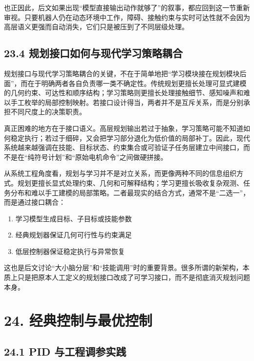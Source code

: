也正因此，后文如果出现“模型直接输出动作就够了”的叙事，都应回到这一节重新审视。只要机器人仍在动态环境中工作，障碍、接触约束与实时可达性就不会因为高层语义更强而自动消失，它们只是被压到了不同层级处理。

\subsection*{23.4 规划接口如何与现代学习策略耦合}


规划接口与现代学习策略耦合的关键，不在于简单地把“学习模块接在规划模块后面”，而在于明确两者各自负责哪一类不确定性。传统规划更擅长处理可显式建模的几何约束、可达性和顺序结构；学习策略则更擅长处理接触细节、感知噪声和难以手工枚举的局部控制映射。若接口设计得当，两者并不是互斥关系，而是分别承担不同尺度上的决策职责。

真正困难的地方在于接口语义。高层规划输出若过于抽象，学习策略可能不知道如何稳定执行；若过于细碎，又会把学习部分退化为低价值的局部补丁。因此，现代系统越来越强调在技能、目标状态、约束集合或可验证子任务层建立中间接口，而不是在“纯符号计划”和“原始电机命令”之间做硬拼接。

从系统工程角度看，规划与学习并不是对立关系，而更像两种不同的信息组织方式。规划更擅长显式处理约束、几何和可解释结构；学习更擅长吸收复杂观测、任务分布和难以手工建模的局部策略。二者最现实的结合方式，通常不是“二选一”，而是通过接口耦合：

\begin{enumerate}
\item 学习模型生成目标、子目标或技能参数
\item 经典规划器保证几何可行性与约束满足
\item 低层控制器保证稳定执行与异常恢复
\end{enumerate}

这也是后文讨论“大小脑分层”和“技能调用”时的重要背景。很多所谓的新架构，本质上只是把原本人工定义的规划接口改成了可学习接口，而不是彻底消灭规划问题本身。

\section*{24. 经典控制与最优控制}

\subsection*{24.1 PID 与工程调参实践}



